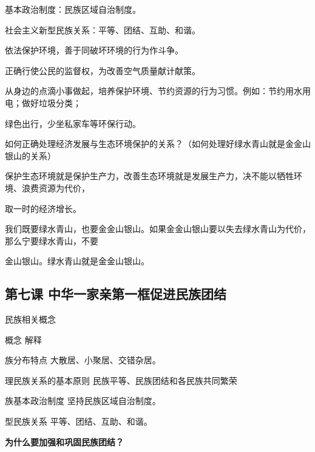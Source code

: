 \documentclass[lang=cn,11pt]{elegantbook}
\begin{document}
基本政治制度：民族区域自治制度。\par

社会主义新型民族关系：平等、团结、互助、和谐。\par

依法保护环境，善于同破坏环境的行为作斗争。\par

正确行使公民的监督权，为改善空气质量献计献策。\par

从身边的点滴小事做起，培养保护环境、节约资源的行为习惯。例如：节约用水用电；做好垃圾分类；\par

绿色出行，少坐私家车等环保行动。\par

如何正确处理经济发展与生态环境保护的关系？（如何处理好绿水青山就是金金山银山的关系）\par

保护生态环境就是保护生产力，改善生态环境就是发展生产力，决不能以牺牲环境、浪费资源为代价，\par

取一时的经济增长。\par

我们既要绿水青山，也要金金山银山。如果金金山银山要以失去绿水青山为代价，那么宁要绿水青山，不要\par

金山银山。绿水青山就是金金山银山。\par

\subsection*{第七课 中华一家亲第一框促进民族团结}

民族相关概念\par

概念 解释\par

族分布特点 大散居、小聚居、交错杂居。\par

理民族关系的基本原则 民族平等、民族团结和各民族共同繁荣\par

族基本政治制度 坚持民族区域自治制度。\par

型民族关系 平等、团结、互助、和谐。\par

\textbf{为什么要加强和巩固民族团结？}\par
\end{document}
